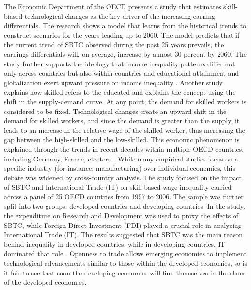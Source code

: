 The Economic Department of the OECD presents a study that estimates skill-biased technological changes as the key driver of the increasing earning differentials. The research shows a model that learns from the historical trends to construct scenarios for the years leading up to 2060. The model predicts that if the current trend of SBTC observed during the past 25 years prevails, the earnings differentials will, on average, increase by almost 30 percent by 2060. The study further supports the ideology that income inequality patterns differ not only across countries but also within countries and educational attainment and globalization exert upward pressure on income inequality \cite{braconier_ruiz-valenzuela_2014}. Another study explains how skilled refers to the educated and explains the concept using the shift in the supply-demand curve. At any point, the demand for skilled workers is considered to be fixed. Technological changes create an upward shift in the demand for skilled workers, and since the demand is greater than the supply, it leads to an increase in the relative wage of the skilled worker, thus increasing the gap between the high-skilled and the low-skilled. This economic phenomenon is explained through the trends in recent decades within multiple OECD countries, including Germany, France, etcetera \cite{atkinson2007distribution}. While many empirical studies focus on a specific industry (for instance, manufacturing) over individual economies, this debate was widened by cross-country analysis. The study focused on the impact of SBTC and International Trade (IT) on skill-based wage inequality carried across a panel of 25 OECD countries from 1997 to 2006. The sample was further split into two groups: developed countries and developing countries. In the study, the expenditure on Research and Development was used to proxy the effects of SBTC, while Foreign Direct Investment (FDI) played a crucial role in analyzing International Trade (IT). The results suggested that SBTC was the main reason behind inequality in developed countries, while in developing countries, IT dominated that role \cite{almeida2010sbtc}. Openness to trade allows emerging economies to implement technological advancements similar to those within the developed economies, so is it fair to see that soon the developing economies will find themselves in the shoes of the developed economies.

